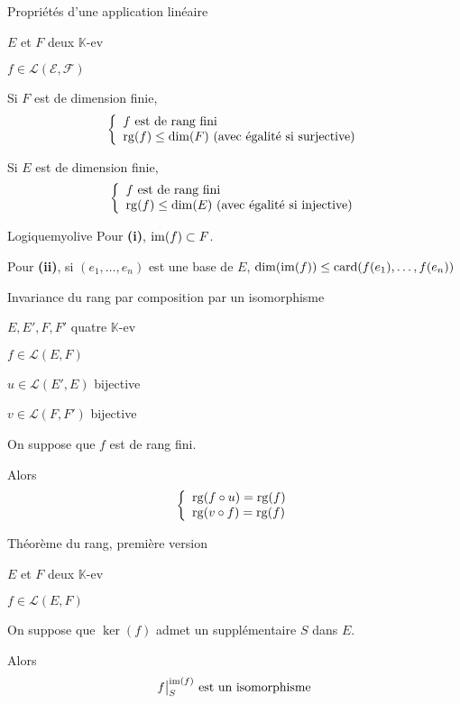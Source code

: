     \begin{prop}{Propriétés d’une application linéaire}{}
        \begin{soient}
            \item $E$ et $F$ deux $\mathbb{K}$-ev
            \item $f \in \mathcal{L}(\mathcal{E},\mathcal{F})$
        \end{soient}
        \begin{alors}
            \item Si $F$ est de dimension finie, 
            \[ \et{f \text{ est de rang fini}}{\rg(f) \leq \dim(F) \text{ (avec égalité si surjective)}} \]
            \item Si $E$ est de dimension finie, 
            \[ \et{f \text{ est de rang fini}}{\rg(f) \leq \dim(E) \text{ (avec égalité si injective)}} \]
        \end{alors}
    \end{prop}
    
    \begin{demo}{Logique}{myolive}
        Pour \textbf{(i)}, $\operatorname{im}(f) \subset F$.
    
        Pour \textbf{(ii)}, si $(e_1,\ldots,e_n)$ est une base de $E$, $\dim(\operatorname{im}(f)) \leq \operatorname{card}(f(e_1),\ldots,f(e_n))$
    \end{demo}
    
    \begin{prop}{Invariance du rang par composition par un isomorphisme}{}
        \begin{soient}
            \item $E,E',F,F'$ quatre $\mathbb{K}$-ev
            \item $f \in \mathcal{L}(E,F)$
            \item $u \in \mathcal{L}(E',E)$ bijective
            \item $v \in \mathcal{L}(F,F')$ bijective
        \end{soient}
        On suppose que $f$ est de rang fini.
    
        Alors \[ \et{\rg(f \circ u) = \rg(f)}{\rg(v \circ f) = \rg(f)} \]
    \end{prop}

    \begin{theo}{Théorème du rang, première version}{}
        \begin{soient}
            \item $E$ et $F$ deux $\mathbb{K}$-ev
            \item $f \in \mathcal{L}(E,F)$
        \end{soient}
        On suppose que $\ker(f)$ admet un supplémentaire $S$ dans $E$.
    
        Alors \[ \restrcorestr{f}{S}{\im(f)} \text{ est un isomorphisme} \]
    \end{theo}
    
